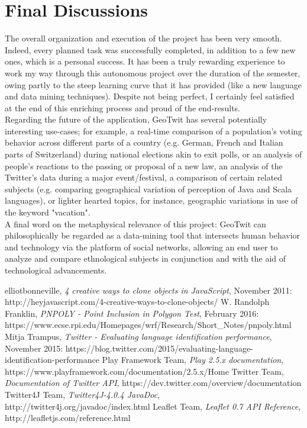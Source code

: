 \documentclass[a4paper,11pt]{report}
\begin{document}
\section{Final Discussions}
The overall organization and execution of the project has been very smooth. Indeed, every planned task was successfully completed, in addition to a few new ones, which is a personal success. It has been a truly rewarding experience to work my way through this autonomous project over the duration of the semester, owing partly to the steep learning curve that it has provided (like a new language and data mining techniques). Despite not being perfect, I certainly feel satisfied at the end of this enriching process and proud of the end-results.\\

Regarding the future of the application, GeoTwit has several potentially interesting use-cases; for example, a real-time comparison of a population's voting behavior across different parts of a country (e.g. German, French and Italian parts of Switzerland) during national elections akin to exit polls, or an analysis of people's reactions to the passing or proposal of a new law, an analysis of the Twitter's data during a major event/festival, a comparison of certain related subjects (e.g. comparing geographical variation of perception of Java and Scala languages), or lighter hearted topics, for instance, geographic variations in use of the keyword "vacation".\\

A final word on the metaphysical relevance of this project: GeoTwit can philosophically be regarded as a data-mining tool that intersects human behavior and technology via the platform of social networks, allowing an end user to analyze and compare ethnological subjects in conjunction and with the aid of technological advancements.
\newpage

\listoffigures
\newpage

\begin{thebibliography}{9}
  elliotbonneville,
  \emph{4 creative ways to clone objects in JavaScript},
  November 2011: http://heyjavascript.com/4-creative-ways-to-clone-objects/
  W. Randolph Franklin,
  \emph{PNPOLY - Point Inclusion in Polygon Test},
  February 2016: https://www.ecse.rpi.edu/Homepages/wrf/Research/Short\_Notes/pnpoly.html
  Mitja Trampus,
  \emph{Twitter - Evaluating language identification performance},
  November 2015: https://blog.twitter.com/2015/evaluating-language-identification-performance
  Play Framework Team,
  \emph{Play 2.5.x documentation},
  \\https://www.playframework.com/documentation/2.5.x/Home
  Twitter Team,
  \emph{Documentation of Twitter API},
  https://dev.twitter.com/overview/documentation
  Twitter4J Team,
  \emph{Twitter4J-4.0.4 JavaDoc},
  http://twitter4j.org/javadoc/index.html
  Leaflet Team,
  \emph{Leaflet 0.7 API Reference},
  http://leafletjs.com/reference.html
\end{thebibliography}
\end{document}
